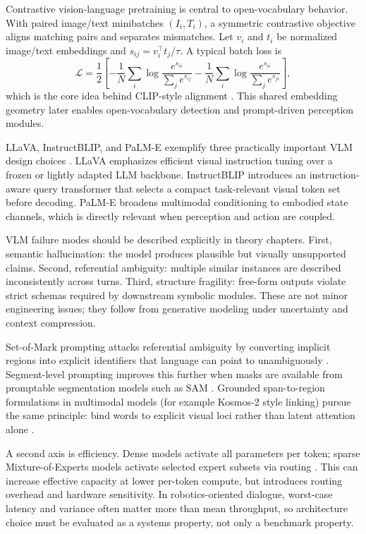   Contrastive vision-language pretraining is central to open-vocabulary behavior. With paired image/text minibatches \((I_i,T_i)\), a symmetric contrastive objective aligns matching pairs and separates
  mismatches. Let \(v_i\) and \(t_i\) be normalized image/text embeddings and \(s_{ij}=v_i^\top t_j/\tau\). A typical batch loss is
  \[
  \mathcal{L}=\frac{1}{2}\left[
  -\frac{1}{N}\sum_i\log\frac{e^{s_{ii}}}{\sum_j e^{s_{ij}}}
  -\frac{1}{N}\sum_i\log\frac{e^{s_{ii}}}{\sum_j e^{s_{ji}}}
  \right],
  \]
  which is the core idea behind CLIP-style alignment \cite{pmlr-v139-radford21a}. This shared embedding geometry later enables open-vocabulary detection and prompt-driven perception modules.

  LLaVA, InstructBLIP, and PaLM-E exemplify three practically important VLM design choices \cite{liu_visual_2023,dai_instructblip_2023,driess_palm-e_2023}. LLaVA emphasizes efficient visual instruction
  tuning over a frozen or lightly adapted LLM backbone. InstructBLIP introduces an instruction-aware query transformer that selects a compact task-relevant visual token set before decoding. PaLM-E
  broadens multimodal conditioning to embodied state channels, which is directly relevant when perception and action are coupled.

  VLM failure modes should be described explicitly in theory chapters. First, semantic hallucination: the model produces plausible but visually unsupported claims. Second, referential ambiguity: multiple
  similar instances are described inconsistently across turns. Third, structure fragility: free-form outputs violate strict schemas required by downstream symbolic modules. These are not minor
  engineering issues; they follow from generative modeling under uncertainty and context compression.

  Set-of-Mark prompting attacks referential ambiguity by converting implicit regions into explicit identifiers that language can point to unambiguously \cite{yang_set-of-mark_2023}. Segment-level
  prompting improves this further when masks are available from promptable segmentation models such as SAM \cite{kirillov_segment_2023}. Grounded span-to-region formulations in multimodal models (for
  example Kosmos-2 style linking) pursue the same principle: bind words to explicit visual loci rather than latent attention alone \cite{peng_kosmos-2_2023}.

  A second axis is efficiency. Dense models activate all parameters per token; sparse Mixture-of-Experts models activate selected expert subsets via routing
  \cite{shazeer2017outrageouslylargeneuralnetworks}. This can increase effective capacity at lower per-token compute, but introduces routing overhead and hardware sensitivity. In robotics-oriented
  dialogue, worst-case latency and variance often matter more than mean throughput, so architecture choice must be evaluated as a systems property, not only a benchmark property.

